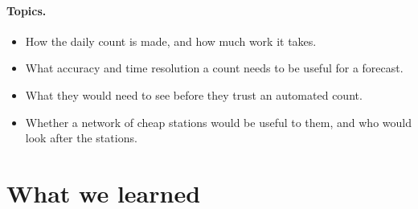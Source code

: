 \paragraph{Topics.}
\begin{itemize}
  \item How the daily count is made, and how much work it takes.
  \item What accuracy and time resolution a count needs to be useful for a forecast.
  \item What they would need to see before they trust an automated count.
  \item Whether a network of cheap stations would be useful to them, and who would look after
  the stations.
\end{itemize}

\section{What we learned}\label{sec:user-needs-results}

